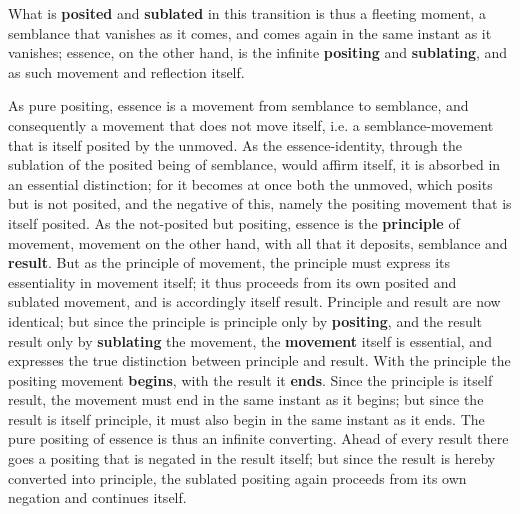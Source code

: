 \documentclass[12pt,a4paper,openany]{book}
\newcommand{\opage}[1]{\marginnote{\footnotesize\textit{[#1]}}}
\begin{document}
What is \textbf{posited} and \textbf{sublated} in this transition is thus a fleeting moment, a semblance that vanishes as it comes, and comes again in the same instant as it vanishes; essence, on the other hand, is the infinite \textbf{positing} and \textbf{sublating}, and as such movement and reflection itself.

As pure positing, essence is a movement from semblance to semblance, and consequently a movement that does not move itself, i.e. a semblance-movement that is itself posited by the unmoved. As the essence-identity, through the sublation of the posited being of semblance, would affirm itself, it is absorbed in an essential distinction; for it becomes at once both the unmoved, which posits but is not posited, and the negative of this, namely the positing movement that is itself posited. As the not-posited but positing, essence is the \textbf{principle} of movement, movement on the other hand, with all that it deposits, semblance and \textbf{result}. But as the principle of movement, the principle must express its essentiality in movement itself; it thus proceeds from its own posited and sublated movement, and is accordingly itself result. Principle and result are now identical; but since the principle is principle only by \textbf{positing}, and the result result only by \textbf{sublating} the movement, the \textbf{movement} itself is essential, and expresses the true distinction between principle and result.
\setcounter{footnote}{0}%
\opage{103}With the principle the positing movement \textbf{begins}, with the result it \textbf{ends}. Since the principle is itself result, the movement must end in the same instant as it begins; but since the result is itself principle, it must also begin in the same instant as it ends. The pure positing of essence is thus an infinite converting. Ahead of every result there goes a positing that is negated in the result itself; but since the result is hereby converted into principle, the sublated positing again proceeds from its own negation and continues itself.
\end{document}
